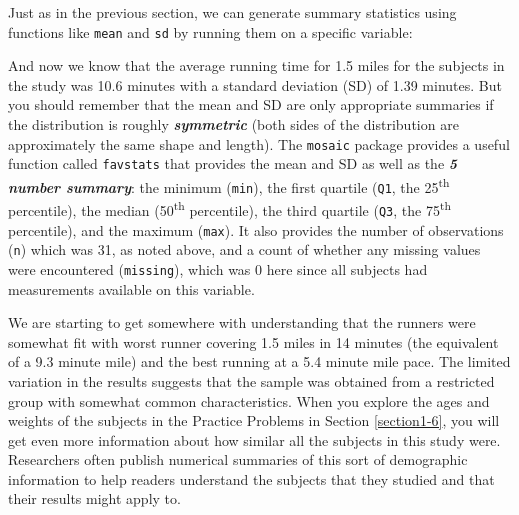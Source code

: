 \documentclass[]{book}
\newenvironment{Shaded}{\begin{snugshade}}{\end{snugshade}}
\newcommand{\DecValTok}[1]{\textcolor[rgb]{0.00,0.00,0.81}{#1}}
\newcommand{\FloatTok}[1]{\textcolor[rgb]{0.00,0.00,0.81}{#1}}
\newcommand{\KeywordTok}[1]{\textcolor[rgb]{0.13,0.29,0.53}{\textbf{#1}}}
\newcommand{\NormalTok}[1]{#1}
\newcommand{\OperatorTok}[1]{\textcolor[rgb]{0.81,0.36,0.00}{\textbf{#1}}}
\newcommand{\StringTok}[1]{\textcolor[rgb]{0.31,0.60,0.02}{#1}}
\renewcommand{\indent}{\hspace{15pt}}
\renewenvironment{Shaded}{%
\setlength{\FrameRule}{1.5pt}
\def\FrameCommand{\fboxrule=\FrameRule\fboxsep=5pt 
                  \fcolorbox{framecolor}{shadecolor}}%
\MakeFramed {\FrameRestore}}%
{\endMakeFramed}
\begin{document}
\indent Just as in the previous section, we can generate summary statistics using functions like \texttt{mean} and \texttt{sd} by running them on a specific variable:

\begin{Shaded}
\end{Shaded}

And now we know that the average running time for 1.5 miles for the subjects in the study was 10.6 minutes with a standard deviation (SD) of 1.39 minutes. But you should remember that the
mean and SD are only appropriate summaries if the distribution is roughly
\textbf{\emph{symmetric}} (both sides of the distribution are approximately the same shape and length). The
\texttt{mosaic} package provides a useful function called \texttt{favstats} that provides
the mean and SD as well as the \textbf{\emph{5 number summary}}: 
the minimum (\texttt{min}), the first quartile (\texttt{Q1}, the 25\textsuperscript{th} percentile),
the median (50\textsuperscript{th} percentile), the third quartile (\texttt{Q3}, the 75\textsuperscript{th}
percentile), and the maximum (\texttt{max}). It also provides the number of
observations (\texttt{n}) which was 31, as noted above, and a count of whether any
missing values were encountered (\texttt{missing}), which was 0 here since all
subjects had measurements available on this variable.

\begin{Shaded}
\end{Shaded}

\indent We are starting to get somewhere with understanding that the runners were
somewhat fit with worst runner covering 1.5 miles in 14 minutes
(the equivalent of a 9.3 minute mile)
and the best running at a 5.4 minute mile pace. The limited variation in the
results suggests that the sample was obtained from a restricted group with
somewhat common characteristics. When you explore the ages and weights of the
subjects in the Practice Problems in Section \ref{section1-6}, you will get even more
information about how similar all the subjects in this study were. Researchers often publish numerical summaries of this sort of demographic information to help readers understand the subjects that they studied and that their results might apply to.
\end{document}
